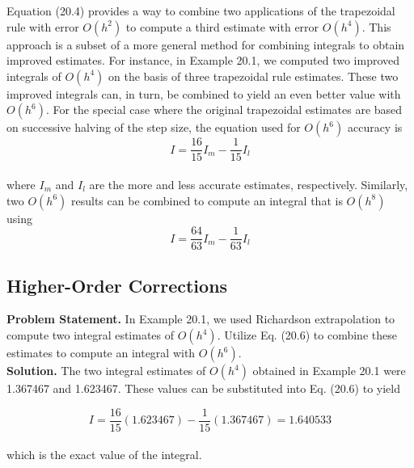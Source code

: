 \documentclass[../main.tex]{subfiles}
\begin{document}
\vspace{0.3in}
Equation (20.4) provides a way to combine two applications of the trapezoidal rule
with error $O(h^2)$ to compute a third estimate with error $O(h^4)$. This approach is a subset of
a more general method for combining integrals to obtain improved estimates. For instance,
in Example 20.1, we computed two improved integrals of $O(h^4)$ on the basis of three trapezoidal rule estimates. These two improved integrals can, in turn, be combined to yield an
even better value with $O(h^6)$. For the special case where the original trapezoidal estimates
are based on successive halving of the step size, the equation used for $O(h^6)$ accuracy is
\begin{equation}
	\tag{20.6}
	I=\dfrac{16}{15}I_m-\dfrac{1}{15}I_l
\end{equation}\\
where $I_m$ and $I_l$ are the more and less accurate estimates, respectively. Similarly, two
$O(h^6)$ results can be combined to compute an integral that is $O(h^8)$ using
\begin{equation}
	\tag{20.7}
	I=\dfrac{64}{63}I_m-\dfrac{1}{63}I_l
\end{equation}


\subsection{Higher-Order Corrections}
\textbf{Problem Statement.}  In Example 20.1, we used Richardson extrapolation to compute two
integral estimates of $O(h^4)$. Utilize Eq. (20.6) to combine these estimates to compute an
integral with $O(h^6)$.\\
\vspace{0.1in}
\textbf{Solution.} The two integral estimates of $O(h^4)$ obtained in Example 20.1 were 1.367467
and 1.623467. These values can be substituted into Eq. (20.6) to yield

	$$I=\dfrac{16}{15}(1.623467)-\dfrac{1}{15}(1.367467)=1.640533$$\\
which is the exact value of the integral.
\end{document}
